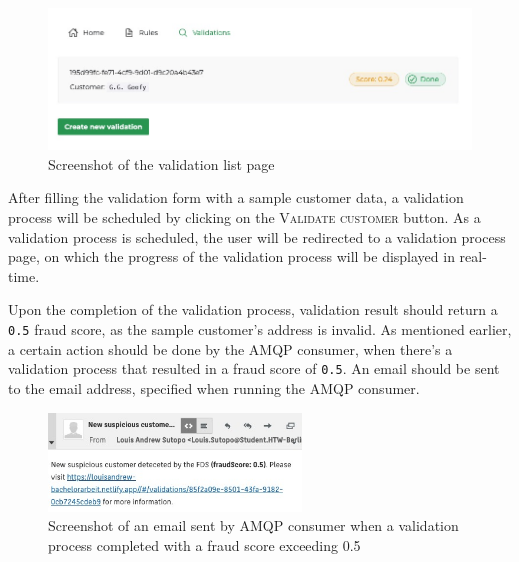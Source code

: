   \begin{figure}[!ht]
   \centering
   \includegraphics[width=\textwidth]{images/ss_validation_list.jpeg}
   \caption{Screenshot of the validation list page}
  \end{figure}

  After filling the validation form with a sample customer data, a validation process will be scheduled by clicking on the \textsc{Validate customer} button. As a validation process is scheduled, the user will be redirected to a validation process page, on which the progress of the validation process will be displayed in real-time. 

  Upon the completion of the validation process, validation result should return a \verb;0.5; fraud score, as the sample customer's address is invalid. As mentioned earlier, a certain action should be done by the AMQP consumer, when there's a validation process that resulted in a fraud score of \verb;0.5;. An email should be sent to the email address, specified when running the AMQP consumer. 
  
  \begin{figure}[!ht]
   \centering
   \includegraphics[width=0.6\textwidth]{images/ss_email.jpeg}
   \caption{Screenshot of an email sent by AMQP consumer when a validation process completed with a fraud score exceeding 0.5}
  \end{figure}